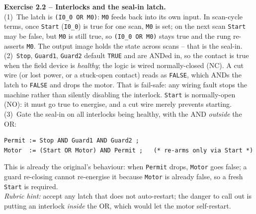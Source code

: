 \documentclass[11pt,a4paper]{article}
\begin{document}
\begin{solutionbox}
\textbf{Exercise 2.2 -- Interlocks and the seal-in latch.}\\[2pt]
(1)~The latch is \texttt{(I0\_0 OR M0)}: \texttt{M0} feeds back into its own input. In scan-cycle
terms, once \texttt{Start} (\texttt{I0\_0}) is true for one scan, \texttt{M0} is set; on the next
scan \texttt{Start} may be false, but \texttt{M0} is still true, so \texttt{(I0\_0 OR M0)} stays
true and the rung re-asserts \texttt{M0}. The output image holds the state across scans -- that is
the seal-in.\\
(2)~\texttt{Stop}, \texttt{Guard1}, \texttt{Guard2} default \texttt{TRUE} and are ANDed in, so the
contact is true when the field device is \emph{healthy}; the logic is wired normally-closed (NC).
A cut wire (or lost power, or a stuck-open contact) reads as \texttt{FALSE}, which ANDs the latch
to \texttt{FALSE} and drops the motor. That is fail-safe: any wiring fault stops the machine rather
than silently disabling the interlock. \texttt{Start} is normally-open (NO): it must go true to
energise, and a cut wire merely prevents starting.\\
(3)~Gate the seal-in on all interlocks being healthy, with the AND \emph{outside} the OR:
\begin{lstlisting}
Permit := Stop AND Guard1 AND Guard2 ;
Motor  := (Start OR Motor) AND Permit ;   (* re-arms only via Start *)
\end{lstlisting}
This is already the original's behaviour: when \texttt{Permit} drops, \texttt{Motor} goes false; a
guard re-closing cannot re-energise it because \texttt{Motor} is already false, so a fresh
\texttt{Start} is required.\\[2pt]
\emph{Rubric hint:} accept any latch that does not auto-restart; the danger to call out is putting
an interlock \emph{inside} the OR, which would let the motor self-restart.
\end{solutionbox}
\end{document}
